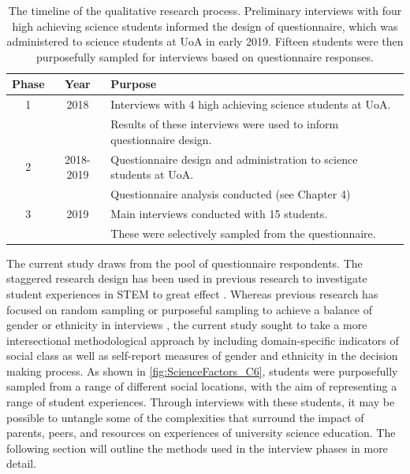 \begin{table}[ht]
\begin{tabular}{c|c|l}
                      
Phase  & Year & Purpose    \\ \hline
1   & 2018  & Interviews with 4 high achieving science students at UoA.     \\
& & Results of these interviews were used to inform questionnaire design. \\ \hline
2  & 2018-2019 & Questionnaire design and administration to science students at UoA.  \\
& & Questionnaire analysis conducted (see Chapter 4)\\ \hline
3 & 2019 & Main interviews conducted with 15 students. \\
& & These were selectively sampled from the questionnaire. \\ \hline
\end{tabular}
\caption{\label{tab:Phases} The timeline of the qualitative research process. Preliminary interviews with four high achieving science students informed the design of questionnaire, which was administered to science students at UoA in early 2019. Fifteen students were then purposefully sampled for interviews based on questionnaire responses.}
\end{table}

The current study draws from the pool of questionnaire respondents. The staggered research design has been used in previous research to investigate student experiences in STEM to great effect \citep{grossman2014perceived,russell2011factors}. Whereas previous research has focused on random sampling \cite{russell2011factors} or purposeful sampling to achieve a balance of gender or ethnicity in  interviews \citep{grossman2014perceived}, the current study sought to take a more intersectional methodological approach by including domain-specific indicators of social class as well as self-report measures of gender and ethnicity in the decision making process. As shown in \ref{fig:ScienceFactors_C6}, students were purposefully sampled from a range of different social locations, with the aim of representing a range of student experiences. Through interviews with these students, it may be possible to untangle some of the complexities that surround the impact of parents, peers, and resources on experiences of university science education. The following section will outline the methods used in the interview phases in more detail.

